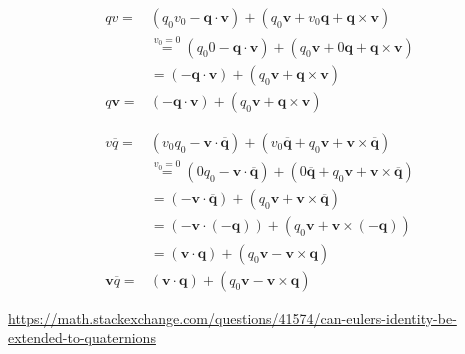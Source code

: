 \documentclass[
]{book}
\theoremstyle{definition}
\theoremstyle{definition}
\theoremstyle{definition}
\theoremstyle{definition}
\theoremstyle{remark}
\begin{document}
\[
\begin{aligned}
qv= & \left(q_{{\scriptscriptstyle 0}}v_{{\scriptscriptstyle 0}}-\boldsymbol{q}\cdot\boldsymbol{v}\right)+\left(q_{{\scriptscriptstyle 0}}\boldsymbol{v}+v_{{\scriptscriptstyle 0}}\boldsymbol{q}+\boldsymbol{q}\times\boldsymbol{v}\right)\\
 & \overset{v_{{\scriptscriptstyle 0}}=0}{=}\left(q_{{\scriptscriptstyle 0}}0-\boldsymbol{q}\cdot\boldsymbol{v}\right)+\left(q_{{\scriptscriptstyle 0}}\boldsymbol{v}+0\boldsymbol{q}+\boldsymbol{q}\times\boldsymbol{v}\right)\\
 & =\left(-\boldsymbol{q}\cdot\boldsymbol{v}\right)+\left(q_{{\scriptscriptstyle 0}}\boldsymbol{v}+\boldsymbol{q}\times\boldsymbol{v}\right)\\
q\boldsymbol{v}= & \left(-\boldsymbol{q}\cdot\boldsymbol{v}\right)+\left(q_{{\scriptscriptstyle 0}}\boldsymbol{v}+\boldsymbol{q}\times\boldsymbol{v}\right)
\end{aligned}
\]

\[
\begin{aligned}
v\overline{q}= & \left(v_{{\scriptscriptstyle 0}}q_{{\scriptscriptstyle 0}}-\boldsymbol{v}\cdot\overline{\boldsymbol{q}}\right)+\left(v_{{\scriptscriptstyle 0}}\overline{\boldsymbol{q}}+q_{{\scriptscriptstyle 0}}\boldsymbol{v}+\boldsymbol{v}\times\overline{\boldsymbol{q}}\right)\\
 & \overset{v_{{\scriptscriptstyle 0}}=0}{=}\left(0q_{{\scriptscriptstyle 0}}-\boldsymbol{v}\cdot\overline{\boldsymbol{q}}\right)+\left(0\overline{\boldsymbol{q}}+q_{{\scriptscriptstyle 0}}\boldsymbol{v}+\boldsymbol{v}\times\overline{\boldsymbol{q}}\right)\\
 & =\left(-\boldsymbol{v}\cdot\overline{\boldsymbol{q}}\right)+\left(q_{{\scriptscriptstyle 0}}\boldsymbol{v}+\boldsymbol{v}\times\overline{\boldsymbol{q}}\right)\\
 & =\left(-\boldsymbol{v}\cdot\left(-\boldsymbol{q}\right)\right)+\left(q_{{\scriptscriptstyle 0}}\boldsymbol{v}+\boldsymbol{v}\times\left(-\boldsymbol{q}\right)\right)\\
 & =\left(\boldsymbol{v}\cdot\boldsymbol{q}\right)+\left(q_{{\scriptscriptstyle 0}}\boldsymbol{v}-\boldsymbol{v}\times\boldsymbol{q}\right)\\
\boldsymbol{v}\overline{q}= & \left(\boldsymbol{v}\cdot\boldsymbol{q}\right)+\left(q_{{\scriptscriptstyle 0}}\boldsymbol{v}-\boldsymbol{v}\times\boldsymbol{q}\right)
\end{aligned}
\]

\url{https://math.stackexchange.com/questions/41574/can-eulers-identity-be-extended-to-quaternions}
\end{document}
